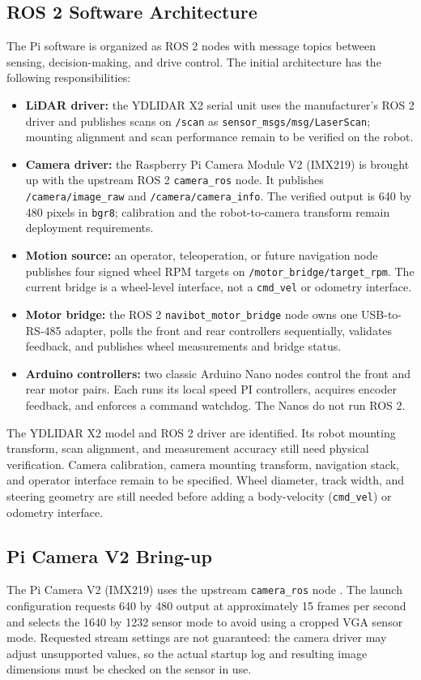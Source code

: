 \subsection{ROS 2 Software Architecture}
The Pi software is organized as ROS 2 nodes with message topics between sensing, decision-making, and drive control. The initial architecture has the following responsibilities:
\begin{itemize}
    \item \textbf{LiDAR driver:} the YDLIDAR X2 serial unit uses the manufacturer's ROS 2 driver and publishes scans on \texttt{/scan} as \texttt{sensor\_msgs/msg/LaserScan}; mounting alignment and scan performance remain to be verified on the robot.
    \item \textbf{Camera driver:} the Raspberry Pi Camera Module V2 (IMX219) is brought up with the upstream ROS 2 \texttt{camera\_ros} node. It publishes \texttt{/camera/image\_raw} and \texttt{/camera/camera\_info}. The verified output is 640 by 480 pixels in \texttt{bgr8}; calibration and the robot-to-camera transform remain deployment requirements.
    \item \textbf{Motion source:} an operator, teleoperation, or future navigation node publishes four signed wheel RPM targets on \texttt{/motor\_bridge/target\_rpm}. The current bridge is a wheel-level interface, not a \texttt{cmd\_vel} or odometry interface.
    \item \textbf{Motor bridge:} the ROS 2 \texttt{navibot\_motor\_bridge} node owns one USB-to-RS-485 adapter, polls the front and rear controllers sequentially, validates feedback, and publishes wheel measurements and bridge status.
    \item \textbf{Arduino controllers:} two classic Arduino Nano nodes control the front and rear motor pairs. Each runs its local speed PI controllers, acquires encoder feedback, and enforces a command watchdog. The Nanos do not run ROS 2.
\end{itemize}

The YDLIDAR X2 model and ROS 2 driver are identified. Its robot mounting transform, scan alignment, and measurement accuracy still need physical verification. Camera calibration, camera mounting transform, navigation stack, and operator interface remain to be specified. Wheel diameter, track width, and steering geometry are still needed before adding a body-velocity (\texttt{cmd\_vel}) or odometry interface.

\subsection{Pi Camera V2 Bring-up}
The Pi Camera V2 (IMX219) uses the upstream \texttt{camera\_ros} node \cite{camera_ros}. The launch configuration requests 640 by 480 output at approximately 15 frames per second and selects the 1640 by 1232 sensor mode to avoid using a cropped VGA sensor mode. Requested stream settings are not guaranteed: the camera driver may adjust unsupported values, so the actual startup log and resulting image dimensions must be checked on the sensor in use.

